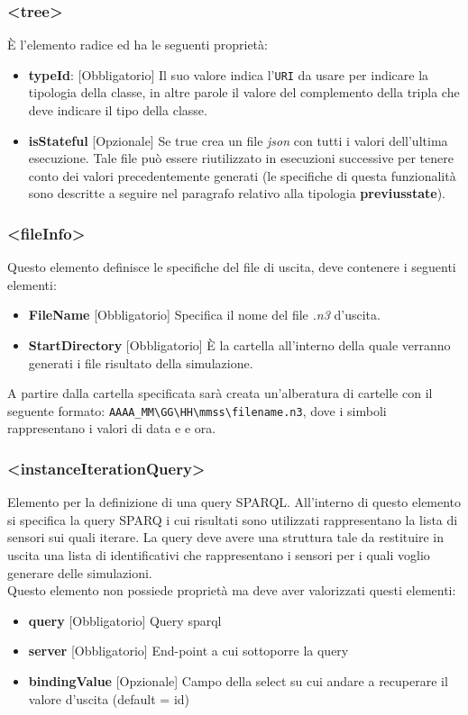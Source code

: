 \documentclass[12pt,a4paper,italian]{article}
\begin{document}
\subsubsection{\large{<tree>}}
\`E l'elemento radice ed ha le seguenti proprietà:
\begin{itemize}
	\item \textbf{typeId}: [Obbligatorio] Il suo valore indica l'\texttt{URI} da usare per indicare la tipologia della classe, in altre parole il valore del complemento della tripla 
	che deve indicare il tipo della classe.
	\item \textbf{isStateful} [Opzionale] Se true crea un file \emph{json} con tutti i valori dell'ultima esecuzione. Tale file può essere riutilizzato in esecuzioni successive per tenere conto dei valori 
	precedentemente generati (le specifiche di questa funzionalità sono descritte a seguire nel paragrafo relativo alla tipologia \textbf{previusstate}). 
\end{itemize}
\subsubsection{\large{<fileInfo>}}
Questo elemento definisce le specifiche del file di uscita, deve contenere i seguenti elementi:
\begin{itemize}
	\item \textbf{FileName} [Obbligatorio] Specifica il nome del file \emph{.n3} d'uscita.
	\item \textbf{StartDirectory} [Obbligatorio] \`E la cartella all'interno della quale verranno generati i file risultato della simulazione.
\end{itemize}
A partire dalla cartella specificata sarà creata un'alberatura di cartelle con il seguente formato: \texttt{AAAA\_MM\textbackslash GG\textbackslash HH\textbackslash mmss\textbackslash filename.n3}, dove i simboli rappresentano i valori di data e e ora.


\subsubsection{\large{<instanceIterationQuery>}}
Elemento per la definizione di una query SPARQL. All'interno di questo elemento si specifica la query SPARQ i cui risultati sono utilizzati rappresentano la lista di sensori sui quali iterare.
La query deve avere una struttura tale da restituire in uscita una lista di identificativi che rappresentano i sensori per i quali voglio generare delle simulazioni.\\
Questo elemento non possiede proprietà ma deve aver valorizzati questi elementi:
\begin{itemize}
	\item \textbf{query} [Obbligatorio] Query sparql
	\item \textbf{server} [Obbligatorio] End-point a cui sottoporre la query
	\item \textbf{bindingValue} [Opzionale] Campo della select su cui andare a recuperare il valore d'uscita (default = id)
\end{itemize}
\end{document}
